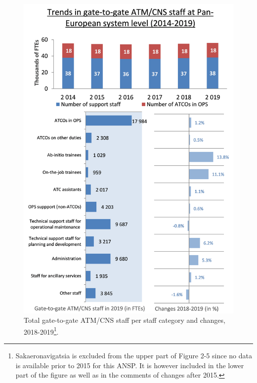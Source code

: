 \documentclass[
]{book}
\begin{document}
\begin{cols}

\begin{col}{0.55\textwidth}

\begin{figure}

{\centering \includegraphics[width=1\linewidth]{figures/Figure 2-5} 

}

\caption{Total gate-to-gate ATM/CNS staff per staff category and changes, 2018-2019\footnote{Sakaeronavigatsia is excluded from the upper part of Figure 2-5 since no data is available prior to 2015 for this ANSP. It is however included in the lower part of the figure as well as in the comments of changes after 2015.}.}\label{fig:figure8}
\end{figure}


\end{col}
\end{cols}
\end{document}
